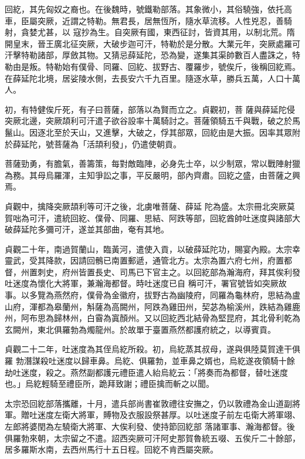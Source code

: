
\begin{pinyinscope}

 回紇，其先匈奴之裔也。在後魏時，號鐵勒部落。其象微小，其俗驍強，依托高車，臣屬突厥，近謂之特勒。無君長，居無恆所，隨水草流移。人性兇忍，善騎射，貪婪尤甚，以
 寇抄為生。自突厥有國，東西征討，皆資其用，以制北荒。隋開皇末，晉王廣北征突厥，大破步迦可汗，特勒於是分散。大業元年，突厥處羅可汗擊特勒諸部，厚斂其物。又猜忌薛延陀，恐為變，遂集其渠帥數百人盡誅之，特勒由是叛。特勒始有僕骨、同羅、回紇、拔野古、覆羅步，號俟斤，後稱回紇焉。在薛延陀北境，居娑陵水側，去長安六千九百里。隨逐水草，勝兵五萬，人口十萬人。



 初，有特健俟斤死，有子曰菩薩，部落以為賢而立之。貞觀初，菩
 薩與薛延陀侵突厥北邊，突厥頡利可汗遣子欲谷設率十萬騎討之。菩薩領騎五千與戰，破之於馬鬣山。因逐北至於天山，又進擊，大破之，俘其部眾，回紇由是大振。因率其眾附於薛延陀，號菩薩為「活頡利發」，仍遣使朝貢。



 菩薩勁勇，有膽氣，善籌策，每對敵臨陣，必身先士卒，以少制眾，常以戰陣射獵為務。其母烏羅渾，主知爭訟之事，平反嚴明，部內齊肅。回紇之盛，由菩薩之興焉。



 貞觀中，擒降突厥頡利等可汗之後，北虜唯菩薩、薛延
 陀為盛。太宗冊北突厥莫賀咄為可汗，遣統回紇、僕骨、同羅、思結、阿跌等部，回紇酋帥吐迷度與諸部大破薛延陀多彌可汗，遂並其部曲，奄有其地。



 貞觀二十年，南過賀蘭山，臨黃河，遣使入貢，以破薛延陀功，賜宴內殿。太宗幸靈武，受其降款，因請回鶻已南置郵遞，通管北方。太宗為置六府七州，府置都督，州置刺史，府州皆置長史、司馬已下官主之。以回紇部為瀚海府，拜其俟利發吐迷度為懷化大將軍，兼瀚海都督。時吐迷度已自
 稱可汗，署官號皆如突厥故事。以多覽為燕然府，僕骨為金徽府，拔野古為幽陵府，同羅為龜林府，思結為盧山府，渾都為皋蘭州，斛薩為高闕州，阿跌為雞田州，契苾為榆溪州，跌結為雞鹿州，阿布思為歸林州，白霫為寘顏州。又以回紇西北結骨為堅昆府，其北骨利乾為玄闕州，東北俱羅勃為燭龍州。於故單于臺置燕然都護府統之，以導賓貢。



 貞觀二十二年，吐迷度為其侄烏紇所殺。初，烏紇蒸其叔母，遂與俱陸莫賀達干俱羅
 勃潛謀殺吐迷度以歸車鼻。烏紇、俱羅勃，並車鼻之婿也，烏紇遂夜領騎十餘劫吐迷度，殺之。燕然副都護元禮臣遣人紿烏紇云：「將奏而為都督，替吐迷度也。」烏紇輕騎至禮臣所，跪拜致謝；禮臣擒而斬之以聞。



 太宗恐回紇部落攜離，十月，遣兵部尚書崔敦禮往安撫之，仍以敦禮為金山道副將軍。贈吐迷度左衛大將軍，賻物及衣服設祭甚厚。以吐迷度子前左屯衛大將軍翊、左郎將婆閏為左驍衛大將軍、大俟利發、使持節回紇部
 落諸軍事、瀚海都督。後俱羅勃來朝，太宗留之不遣。詔西突厥可汗阿史那賀魯統五啜、五俟斤二十餘部，居多羅斯水南，去西州馬行十五日程。回紇不肯西屬突厥。




\end{pinyinscope}
